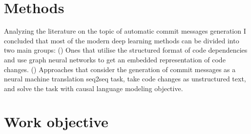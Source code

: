 \section{Methods}
Analyzing the literature on the topic of automatic commit messages generation I concluded that most of the modern deep learning methods can be divided into two main groups: () Ones that utilise the structured format of code dependencies and use graph neural networks to get an embedded representation of code changes. () Approaches that consider the generation of commit messages as a neural machine translation seq2seq task, take code changes as unstructured text, and solve the task with causal language modeling objective. 


\section{Work objective}